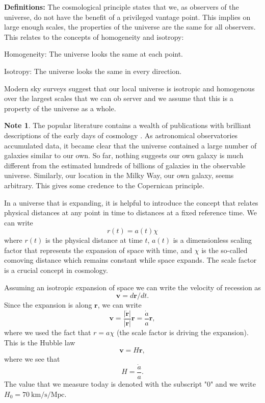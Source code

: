 \documentclass[a4paper,12pt]{article}
\theoremstyle{remark}
\newcommand{\mrm}[1]{\mathrm{#1}}
\renewcommand{\=}[1]{\stackrel{#1}{=}} %
\theoremstyle{plain}
\theoremstyle{definition}
\newtheorem*{definitionT}{Note}%
\newenvironment{note}{
\begin{dBox}
\begin{definitionT}}
{\end{definitionT}
\end{dBox}}
\begin{document}
\textbf{Definitions:} The cosmological principle states that we, as observers of the universe, do not have the benefit of a privileged vantage point. This implies on large enough scales, the properties of the universe are the same for all observers. This relates to the concepts of homogeneity and isotropy:
 
Homogeneity: The universe looks the same at each point.

Isotropy: The universe looks the same in every direction.

Modern sky surveys suggest that our local universe is isotropic and homogenous over the largest scales that we can ob server and we assume that this is a property of the universe as a whole.

 \begin{note}
 The popular literature contains a wealth of publications with brilliant descriptions of the early days of cosmology \cite{Lemaitre2005, Guth1997, Singh2005, Weinberg1993}. As astronomical observatories accumulated data, it became clear that the universe contained a large number of galaxies similar to our own. So far, nothing suggests our own galaxy is much different from the estimated hundreds of billions of galaxies in the observable universe. Similarly, our location in the Milky Way, our own galaxy, seems arbitrary. This gives some credence to the Copernican principle.
 \end{note}

In a universe that is expanding, it is helpful to introduce the concept that relates physical distances at any point in time to distances at a fixed reference time. We can write
\begin{equation}
r(t) = a(t) \chi
\end{equation}
where $r(t)$ is the physical distance at time $t$, $a(t)$ is a dimensionless scaling factor that represents the expansion of space with time, and $\chi$ is the so-called comoving distance which remains constant while space expands. The scale factor is a crucial concept in cosmology. 

Assuming an isotropic expansion of space we can write the velocity of recession as 
\begin{equation}
\bm{v} = d\bm{r} / dt.
\end{equation}
Since the expansion is along $\bm{r}$, we can write 
\begin{equation}
\bm{v} = \frac{|\dot{\bm{r}}|}{|\bm{r}|} \bm{r} = \frac{\dot{a}}{a} \bm{r},
\end{equation}
where we used the fact that $r = a\chi$ (the scale factor is driving the expansion). This is the Hubble law
\begin{equation}
\bm{v} = H\bm{r},
\end{equation}
where we see that 
\begin{equation}
H = \frac{\dot{a}}{a}.
\end{equation}
The value that we measure today is denoted with the subscript "0" and we write $H_0 = 70 \:\mrm{km/s/Mpc}$.
\end{document}
